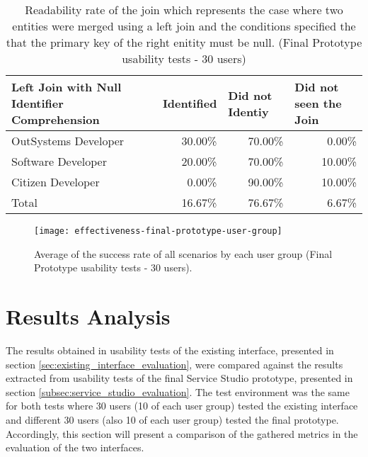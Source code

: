 \begin{table}[tb]
  \caption{Readability rate of the join which represents the case where two entities were merged using a left join and the conditions specified the that the primary key of the right enitity must be null. (Final Prototype usability tests - 30 users)}
    \label{tab:finalPrototypeLeftJoinNull}
  \begin{tabular}{@{}m{5.4cm}rrr@{}}
  \toprule
  \textbf{Left Join with Null Identifier Comprehension} & \multicolumn{1}{l}{Identified} & \multicolumn{1}{l}{Did not Identiy} & \multicolumn{1}{l}{Did not seen the Join} \\ \midrule
  OutSystems Developer                                  & 30.00\%                        & 70.00\%                                & 0.00\%                                    \\
  Software Developer                                    & 20.00\%                        & 70.00\%                                & 10.00\%                                   \\
  Citizen Developer                                     & 0.00\%                         & 90.00\%                                & 10.00\%                                   \\
  Total                                                 & 16.67\%                        & 76.67\%                                & 6.67\%                                    \\ \bottomrule
  \end{tabular}
  \end{table}


\begin{figure}[htbp]
	\centering
	\texttt{[image: effectiveness-final-prototype-user-group]}
	\caption{Average of the success rate of all scenarios by each user group (Final Prototype usability tests - 30 users).}
	\label{fig:effectivenessFinalPrototypeUserGroup}
\end{figure}



\section{Results Analysis}
\label{sec:results_analysis}

The results obtained in usability tests of the existing interface, presented in section \ref{sec:existing_interface_evaluation}, were compared against the results extracted from usability tests of the final Service Studio prototype, presented in section \ref{subsec:service_studio_evaluation}. The test environment was the same for both tests where 30 users (10 of each user group) tested the existing interface and different 30 users (also 10 of each user group) tested the final prototype. Accordingly, this section will present a comparison of the gathered metrics in the evaluation of the two interfaces.


